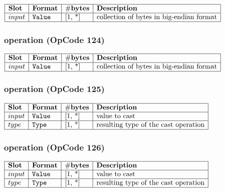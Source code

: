 \noindent
\(\begin{array}{| l | l | l | l |}
    \hline
    \bf{Slot} & \bf{Format} & \bf{\#bytes} & \bf{Description} \\
    \hline
         input & \lst{Value} & \text{[1, *]} & \text{collection of bytes in big-endian format} \\
    \hline
      
\end{array}\)
       

\subsubsection{ operation (OpCode 124)}

\noindent
\(\begin{array}{| l | l | l | l |}
    \hline
    \bf{Slot} & \bf{Format} & \bf{\#bytes} & \bf{Description} \\
    \hline
         input & \lst{Value} & \text{[1, *]} & \text{collection of bytes in big-endian format} \\
    \hline
      
\end{array}\)
       

\subsubsection{ operation (OpCode 125)}

\noindent
\(\begin{array}{| l | l | l | l |}
    \hline
    \bf{Slot} & \bf{Format} & \bf{\#bytes} & \bf{Description} \\
    \hline
         input & \lst{Value} & \text{[1, *]} & \text{value to cast} \\
    \hline
           type & \lst{Type} & \text{[1, *]} & \text{resulting type of the cast operation} \\
    \hline
      
\end{array}\)
       

\subsubsection{ operation (OpCode 126)}

\noindent
\(\begin{array}{| l | l | l | l |}
    \hline
    \bf{Slot} & \bf{Format} & \bf{\#bytes} & \bf{Description} \\
    \hline
         input & \lst{Value} & \text{[1, *]} & \text{value to cast} \\
    \hline
           type & \lst{Type} & \text{[1, *]} & \text{resulting type of the cast operation} \\
    \hline
      
\end{array}\)
       